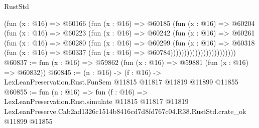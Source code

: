 \begin{lexlean}{RustStd}
\begin{coremodule}
                              (fun (x : @16) =>
                              @60166
                                (fun (x : @16) =>
                                @60185
                                  (fun (x : @16) =>
                                  @60204
                                    (fun (x : @16) =>
                                    @60223
                                      (fun (x : @16) =>
                                      @60242
                                        (fun (x : @16) =>
                                        @60261
                                          (fun (x : @16) =>
                                          @60280
                                            (fun (x : @16) =>
                                            @60299
                                              (fun (x : @16) =>
                                              @60318
                                                (fun (x : @16) =>
                                                @60337
                                                  (fun (x : @16) => @60784))))))))))))))))))))))))
@60837 := fun (x : @16) => @59862 (fun (x : @16) => @59881 (fun (x : @16) => @60832))
@60845 := (n : @16) ->
  (f : @16) -> LexLeanPreservation.Rust.FunSem @11815 @11817 @11819 @11899 @11855
@60855 := fun (n : @16) =>
  fun (f : @16) =>
  LexLeanPreservation.Rust.simulate
    @11815
    @11817
    @11819
    LexLeanPreserve.Cab2ad1326c1514b8416cd7d8fd767c04.R38.RustStd.crate_ok
    @11899
    @11855
\end{coremodule}
\end{lexlean}

